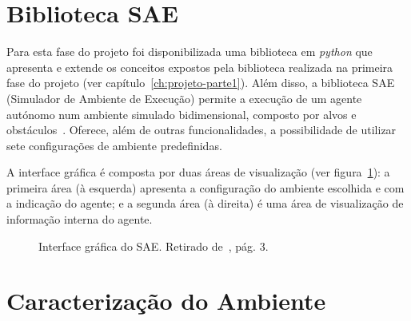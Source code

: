 \section{Biblioteca SAE}\label{sec:biblioteca-sae}

Para esta fase do projeto foi disponibilizada uma biblioteca em \textit{python} que apresenta e extende os conceitos expostos pela biblioteca realizada na primeira fase do projeto (ver capítulo~\ref{ch:projeto-parte1}).
Além disso, a biblioteca SAE (Simulador de Ambiente de Execução) permite a execução de um agente autónomo num ambiente simulado bidimensional, composto por alvos e obstáculos~\cite{isel:iasa:slides:sae-documentacao}.
Oferece, além de outras funcionalidades, a possibilidade de utilizar sete configurações de ambiente predefinidas.

A interface gráfica é composta por duas áreas de visualização (ver figura~\ref{fig:sae-interface-grafica}): a primeira área (à esquerda) apresenta a configuração do ambiente escolhida e com a indicação do agente; e a segunda área (à direita) é uma área de visualização de informação interna do agente.

\begin{figure}[H]
    \begin{center}
    \end{center}
    \caption{Interface gráfica do SAE.
    Retirado de~\cite{isel:iasa:slides:sae-documentacao}, pág.
    3.}\label{fig:sae-interface-grafica}
\end{figure}


\section{Caracterização do Ambiente}\label{sec:caracterizacao-ambiente}


